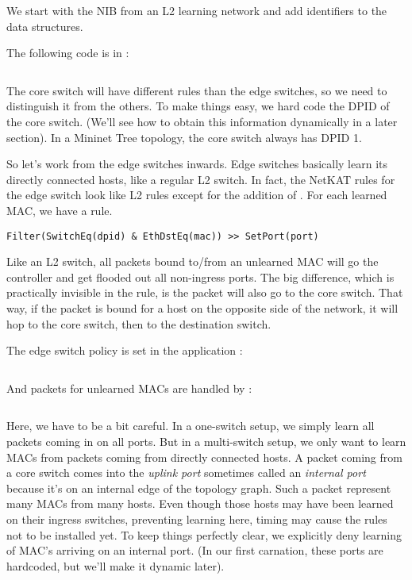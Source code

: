 We start with the NIB from an L2 learning network and add  identifiers to the data
structures.

The following code is in  :

\inputminted{python}{code/multiswitch_topologies/network_information_base.py}

The core switch will have different rules than the edge switches, so we need to distinguish it
from the others.  To make things easy, we hard code the DPID of the core switch.  (We'll see 
how to obtain this information dynamically in a later section).  In a Mininet Tree topology,
the core switch always has DPID 1.  

So let's work from the edge switches inwards.  Edge switches basically learn its directly
connected hosts, like a regular L2 switch.  In fact, the NetKAT rules for the edge switch 
look like L2 rules except for the addition of .  For each learned MAC, we have a rule.

\begin{verbatim}
Filter(SwitchEq(dpid) & EthDstEq(mac)) >> SetPort(port) 
\end{verbatim}

Like an L2 switch, all packets bound to/from an unlearned MAC will go the controller and get flooded
out all non-ingress ports.  The big difference, which is practically invisible in the rule, is
the packet will also go to the core switch.  That way, if the packet is bound for a host on the 
opposite side of the network, it will hop to the core switch, then to the destination switch.  

The edge switch policy is set in the application :

\inputminted[firstline=22,lastline=40]{python}{code/multiswitch_topologies/multiswitch1.py}

And packets for unlearned MACs are handled by :

\inputminted[firstline=54,lastline=78]{python}{code/multiswitch_topologies/multiswitch1.py}

Here, we have to be a bit careful.  In a one-switch setup, we simply learn all packets coming in
on all ports.  But in a multi-switch setup, we only want to learn MACs from packets coming from
directly connected hosts.  A packet coming from a core switch comes into the \emph{uplink port}
sometimes called an \emph{internal port} because it's on an internal edge of the topology
graph.  
Such a packet represent many MACs from many hosts.  Even though those hosts may have been learned on their
ingress switches, preventing learning here, timing may cause the rules not to be installed yet.
To keep things perfectly clear, we explicitly deny learning of MAC's arriving on an internal port.
(In our first carnation, these ports are hardcoded, but we'll make it dynamic later).

